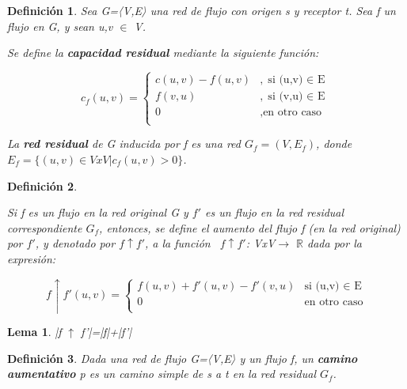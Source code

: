 \documentclass[10pt]{article} %
\newtheorem{mydef}{Definici\'on}%
\newtheorem{lem}{Lema}
\begin{document}
	\begin{mydef}\label{capacidad_residual}
		Sea G=〈V,E〉 una red de flujo con origen s y receptor t. Sea f un flujo en G, y sean u,v $\in$ V.
		
		Se define la \textbf{capacidad residual} mediante la siguiente función:
		
		\begin{equation}
			c_f(u,v) = 	\left\{		
			\begin{array}{lr}				
				c(u,v) -f(u,v) & , \text{si (u,v) $\in$ E}\\
				f(v,u) &, \text{si (v,u) $\in$ E}\\
				0 &,\text{en otro caso}\\
			\end{array}
		\right.
		\end{equation}
	
	La \textbf{red residual} de G inducida por f es una red $G_f=(V,E_f)$, donde 
	$E_f= \{ (u,v) \in VxV | c_f(u,v)>0 \}$.
	\end{mydef}

	\begin{mydef}\label{aumento_flujo}
		
		Si f es un flujo en la red original G y $f'$ es un flujo en la red residual correspondiente $G_f$, entonces, se define el aumento del flujo f (en la  red  original) por $f'$, y denotado por $f\uparrow f'$, a la función  $f\uparrow f'$: VxV$\rightarrow$ $\mathbb{R}$ dada por la expresión:
		
		\begin{equation}
			f\uparrow f'(u,v) = \left\{ \begin{array}{lr}
				f(u,v) + f'(u,v) - f'(v,u) & \text{si (u,v) $\in$ E}\\
				0 & \text{en otro caso}\\
			\end{array}
		\right.
		\end{equation}
		
	\end{mydef}
	
	\begin{lem}
		|f $\uparrow$ f'|=|f|+|f'|
	\end{lem}
	
	\begin{mydef}\label{camino_aumentativo}
		Dada una red de flujo G=〈V,E〉 y un flujo f, un \textbf{camino aumentativo} p es un camino simple de s a t en la red residual $G_f$.
	\end{mydef}
\end{document}

